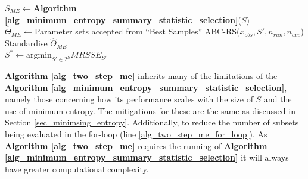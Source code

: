\documentclass[bibliography=totoc,11pt,a4paper,margin=0]{article}
\theoremstyle{break}
\begin{document}
  \begin{box_algorithm}\label{alg_two_step_me}
    \begin{algorithm}[H]
      $S_{ME}\leftarrow$\textbf{Algorithm \ref{alg_minimum_entropy_summary_statistic_selection}}($S$)\\
      $\hat{\Theta}_{ME}\leftarrow$Parameter sets accepted from ``Best Samples'' ABC-RS($x_{obs},S',n_{run},n_{acc}$)\\
      Standardise $\hat\Theta_{ME}$\\
      $S^*\leftarrow\text{argmin}_{S'\in 2^S}MRSSE_{S'}$\\
    \end{algorithm}
  \end{box_algorithm}

  \par \textbf{Algorithm \ref{alg_two_step_me}} inherits many of the limitations of the \textbf{Algorithm \ref{alg_minimum_entropy_summary_statistic_selection}}, namely those concerning how its performance scales with the size of $S$ and the use of minimum entropy. The mitigations for these are the same as discussed in Section \ref{sec_minimsing_entropy}. Additionally, to reduce the number of subsets being evaluated in the for-loop (line \ref{alg_two_step_me_for_loop}). As \textbf{Algorithm \ref{alg_two_step_me}} requires the running of \textbf{Algorithm \ref{alg_minimum_entropy_summary_statistic_selection}} it will always have greater computational complexity.


\end{document}
